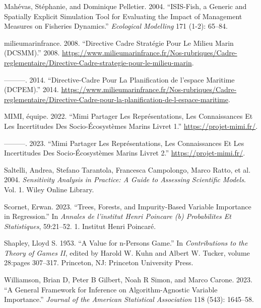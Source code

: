 \documentclass[
]{article}
\newlength{\cslhangindent}
\newlength{\cslentryspacingunit} %
\newenvironment{CSLReferences}[2] %
 {%
  \setlength{\parindent}{0pt}
  \ifodd #1
  \let\oldpar\par
  \def\par{\hangindent=\cslhangindent\oldpar}
  \fi
  \setlength{\parskip}{#2\cslentryspacingunit}
 }%
 {}
\begin{document}
\begin{CSLReferences}{1}{0}
\leavevmode{}%
Mahévas, Stéphanie, and Dominique Pelletier. 2004. {``ISIS-Fish, a
Generic and Spatially Explicit Simulation Tool for Evaluating the Impact
of Management Measures on Fisheries Dynamics.''} \emph{Ecological
Modelling} 171 (1-2): 65--84.

\leavevmode{}%
milieumarinfrance. 2008. {``Directive Cadre Stratégie Pour Le Milieu
Marin (DCSMM).''} 2008.
\url{https://www.milieumarinfrance.fr/Nos-rubriques/Cadre-reglementaire/Directive-Cadre-strategie-pour-le-milieu-marin}.

\leavevmode{}%
---------. 2014. {``Directive-Cadre Pour La Planification de l'espace
Maritime (DCPEM).''} 2014.
\url{https://www.milieumarinfrance.fr/Nos-rubriques/Cadre-reglementaire/Directive-Cadre-pour-la-planification-de-l-espace-maritime}.

\leavevmode{}%
MIMI, équipe. 2022. {``Mimi Partager Les Représentations, Les
Connaissances Et Les Incertitudes Des Socio-Écosystèmes Marins Livret
1.''} \url{https://projet-mimi.fr/}.

\leavevmode{}%
---------. 2023. {``Mimi Partager Les Représentations, Les Connaissances
Et Les Incertitudes Des Socio-Écosystèmes Marins Livret 2.''}
\url{https://projet-mimi.fr/}.

\leavevmode{}%
Saltelli, Andrea, Stefano Tarantola, Francesca Campolongo, Marco Ratto,
et al. 2004. \emph{Sensitivity Analysis in Practice: A Guide to
Assessing Scientific Models}. Vol. 1. Wiley Online Library.

\leavevmode{}%
Scornet, Erwan. 2023. {``Trees, Forests, and Impurity-Based Variable
Importance in Regression.''} In \emph{Annales de l'institut Henri
Poincare (b) Probabilites Et Statistiques}, 59:21--52. 1. Institut Henri
Poincar{é}.

\leavevmode{}%
Shapley, Lloyd S. 1953. {``A Value for n-Persons Game.''} In
\emph{Contributions to the Theory of Games II}, edited by Harold W. Kuhn
and Albert W. Tucker, volume 28:pages 307--317. Princeton, NJ: Princeton
University Press.

\leavevmode{}%
Williamson, Brian D, Peter B Gilbert, Noah R Simon, and Marco Carone.
2023. {``A General Framework for Inference on Algorithm-Agnostic
Variable Importance.''} \emph{Journal of the American Statistical
Association} 118 (543): 1645--58.


\end{CSLReferences}
\end{document}
